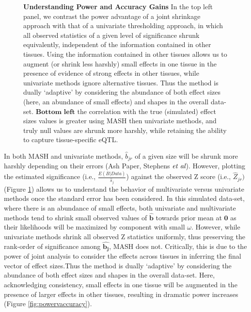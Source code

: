 \begin{figure}[htbp]
\caption{\textbf{Understanding Power and Accuracy Gains} In the top left panel, we contrast the power advantage of a joint shrinkage approach with that of a univariate thresholding approach, in which all observed statistics of a given level of significance shrunk equivalently, independent of the information contained in other tissues. Using the information contained in other tissues allows us to augment (or shrink less harshly) small effects in one tissue in the presence of evidence of strong effects in other tissues, while univariate methods ignore alternative tissues. Thus the method is dually `adaptive' by considering the abundance of both effect sizes (here, an abundance of small effects) and shapes in the overall data-set. $\textbf{Bottom left}$ the correlation with the true (simulated) effect sizes values is greater using MASH then univariate methods, and truly null values are shrunk more harshly, while retaining the ability to capture tissue-specific eQTL.}
 \label{fig:simulationscatter}
\end{figure}\newline

In both MASH and univariate methods, $\hat{b}_{jr}$ of a given size will be shrunk more harshly depending on their errors (Ash Paper, Stephens $\emph{et al}$). 
However, plotting the estimated significance (i.e., $\frac{E(B|Data)}{\hat{s}_{j}}$) against the observed Z score (i.e., $\hat{Z}_{jr})$ (Figure \ref{fig:simulationscatter}) allows us to understand the behavior of multivariate versus univariate methods once the standard error has been considered. 
In this simulated data-set, where there is an abundance of small effects, both univariate and multivariate methods tend to shrink small observed values of $\hat{\bm{b}}$ towards prior mean at $\bm{0}$ as their likelihoods will be maximized by component with small $\omega$. However, while univariate methods shrink all observed Z statistics uniformly, thus preserving the rank-order of significance among $\hat{\bm{b_{j}}}$, MASH does not. Critically, this is due to the power of joint analysis to consider the effects across tissues in inferring the final vector of effect sizes.Thus the method is dually `adaptive' by considering the abundance of both effect sizes and shapes in the overall data-set.  Here, acknowledging consistency, small effects in one tissue will be augmented in the presence of larger effects in other tissues, resulting in dramatic power increases (Figure \ref{fig:powervaccuracy}).


